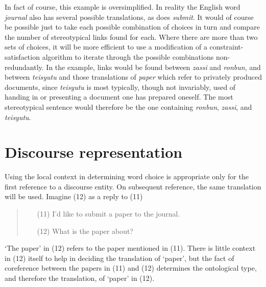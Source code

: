 In fact of course, this example is oversimplified.
In reality the English word
{\it journal\/}
also has several possible translations, as does
{\it submit\/}.
It would of course be possible just to take each possible combination of
choices in turn and compare the number of stereotypical links found for
each.
Where there are more than two sets of choices, it will be more efficient
to use a modification of a constraint-satisfaction algorithm to iterate
through the possible combinations non-redundantly.
In the example, links would be found between
{\it zassi\/}
and
{\it ronbun},
and between
{\it teisyutu\/}
and those translations of
{\it paper\/}
which refer to privately produced documents, since
{\it teisyutu\/}
is most typically, though not invariably, used of handing in or
presenting a document one has prepared oneself.
The most stereotypical sentence would therefore be the one containing
{\it ronbun}, {\it zassi}, and {\it teisyutu}.


\section{Discourse representation}

Using the local context in determining word choice is appropriate only
for the first reference to a discourse entity.
On subsequent reference, the same translation will be used.
Imagine (12) as a reply to (11)
\begin{quote}
  \begin{itemize}
  \item[(11)] I'd like to submit a paper to the journal.
  \item[(12)] What is the paper about?
  \end{itemize}
\end{quote}
`The paper' in (12) refers to the paper mentioned in (11). There is
little context in (12) itself to help in deciding the translation of
`paper', but the fact of coreference between the papers in (11) and (12)
determines the ontological type, and therefore the translation, of
`paper' in (12).

